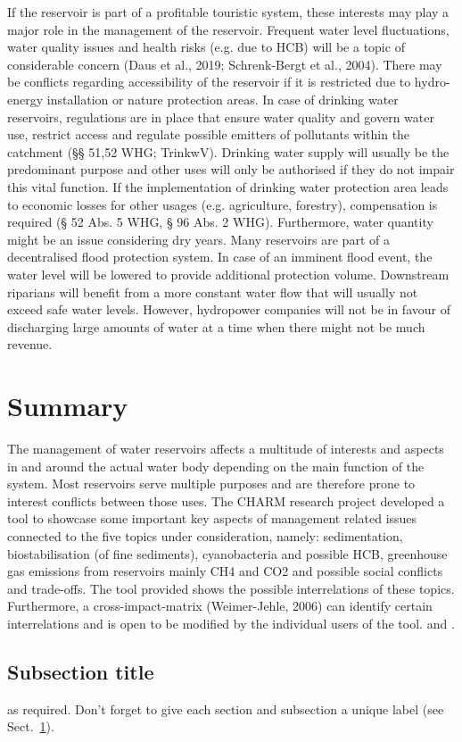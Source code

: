 If the reservoir is part of a profitable touristic system, these interests may play a major role in the management of the reservoir. Frequent water level fluctuations, water quality issues and health risks (e.g. due to HCB) will be a topic of considerable concern (Daus et al., 2019; Schrenk-Bergt et al., 2004). There may be conflicts regarding accessibility of the reservoir if it is restricted due to hydro-energy installation or nature protection areas. 
In case of drinking water reservoirs, regulations are in place that ensure water quality and govern water use, restrict access and regulate possible emitters of pollutants within the catchment (§§ 51,52 WHG; TrinkwV). Drinking water supply will usually be the predominant purpose and other uses will only be authorised if they do not impair this vital function. If the implementation of drinking water protection area leads to economic losses for other usages (e.g. agriculture, forestry), compensation is required (§ 52 Abs. 5 WHG, § 96 Abs. 2 WHG). Furthermore, water quantity might be an issue considering dry years.
Many reservoirs are part of a decentralised flood protection system. In case of an imminent flood event, the water level will be lowered to provide additional protection volume. Downstream riparians will benefit from a more constant water flow that will usually not exceed safe water levels. However, hydropower companies will not be in favour of discharging large amounts of water at a time when there might not be much revenue. 
\section{Summary}
\label{sec:1}
The management of water reservoirs affects a multitude of interests and aspects in and around the actual water body depending on the main function of the system. Most reservoirs serve multiple purposes and are therefore prone to interest conflicts between those uses. The CHARM research project developed a tool to showcase some important key aspects of management related issues connected to the five topics under consideration, namely: sedimentation, biostabilisation (of fine sediments), cyanobacteria and possible HCB, greenhouse gas emissions from reservoirs mainly CH4 and CO2 and possible social conflicts and trade-offs. The tool provided shows the possible  interrelations of these topics. Furthermore, a cross-impact-matrix (Weimer-Jehle, 2006) can identify certain interrelations and is open to be modified by the individual users of the tool.
 \cite{RefB} and \cite{RefJ}.
\subsection{Subsection title}
\label{sec:2}
as required. Don't forget to give each section
and subsection a unique label (see Sect.~\ref{sec:1}).
